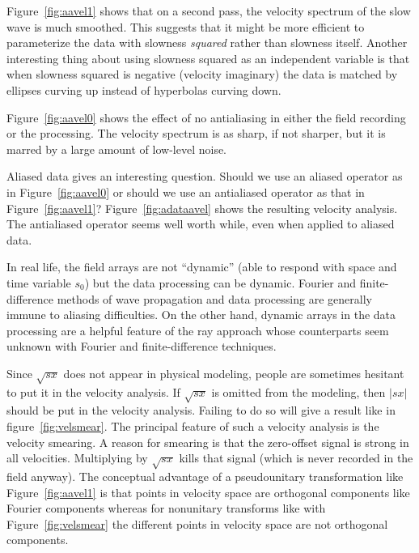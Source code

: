 Figure~\ref{fig:aavel1} shows that on a second pass,
the velocity spectrum of the slow wave is much smoothed.
This suggests that it might be more efficient to parameterize
the data with slowness {\em  squared} rather than slowness itself.
Another interesting thing about using slowness squared as 
an independent variable is that when slowness squared is negative
(velocity imaginary)
the data is matched by ellipses curving up
instead of hyperbolas curving down.

\par
Figure~\ref{fig:aavel0} shows the effect of no antialiasing
in either the field recording or the processing.
The velocity spectrum is as sharp, if not sharper,
but it is marred by a large amount of low-level noise.

\par
Aliased data gives an interesting question.
Should we use an aliased operator as in Figure~\ref{fig:aavel0}
or should we use an antialiased operator as that in Figure~\ref{fig:aavel1}?
Figure~\ref{fig:adataavel} shows the resulting velocity analysis.
The antialiased operator seems well worth while,
even when applied to aliased data.
\par
In real life, the field arrays are not ``dynamic''
(able to respond with space and time variable $s_0$)
but the data processing can be dynamic.
Fourier and finite-difference methods of wave propagation
and data processing are generally immune to aliasing difficulties.
On the other hand,
dynamic arrays in the data processing
are a helpful feature of the ray approach whose counterparts
seem unknown with Fourier and finite-difference techniques.

\par
Since $\sqrt{sx}$ does not appear in physical modeling,
people are sometimes hesitant to put it in the velocity analysis.
If $\sqrt{sx}$ is omitted from the modeling,
then $|sx|$ should be put in the velocity analysis.
Failing to do so will give a result like in figure~\ref{fig:velsmear}.
The principal feature of such a velocity analysis
is the velocity smearing.
A reason for smearing is that the zero-offset signal
is strong in all velocities.
Multiplying by $\sqrt{sx}$ kills that signal
(which is never recorded in the field anyway).
The conceptual advantage of a pseudounitary transformation 
like Figure~\ref{fig:aavel1} is that points in velocity space
are orthogonal components like Fourier components
whereas for nonunitary transforms
like with Figure~\ref{fig:velsmear} 
the different points in velocity space
are not orthogonal components.

